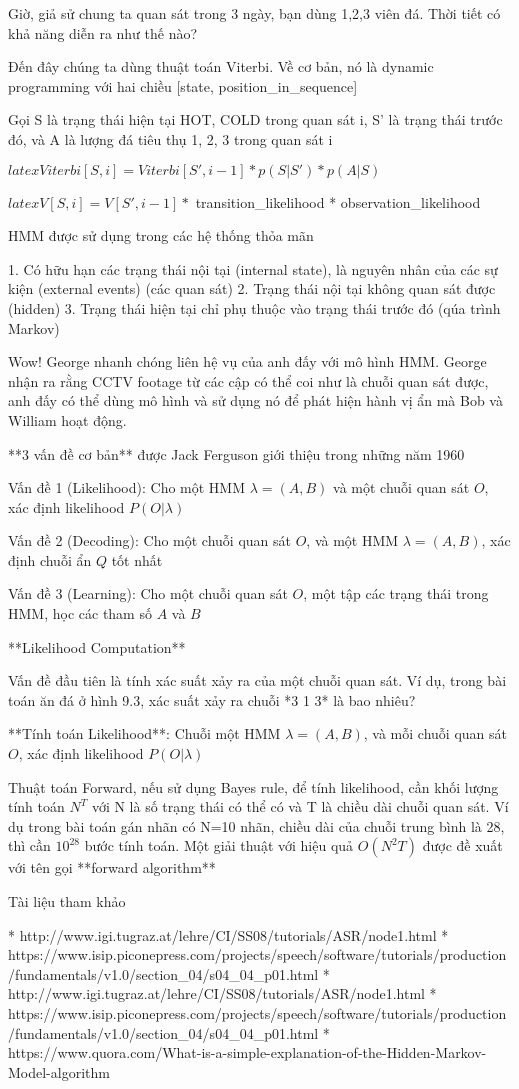 Giờ, giả sử chung ta quan sát trong 3 ngày, bạn dùng 1,2,3 viên đá. Thời tiết có khả năng diễn ra như thế nào?

Đến đây chúng ta dùng thuật toán Viterbi. Về cơ bản, nó là dynamic programming với hai chiều [state, position_in_sequence]

Gọi S là trạng thái hiện tại {HOT, COLD} trong quan sát i, S' là trạng thái trước đó, và A là lượng đá tiêu thụ {1, 2, 3} trong quan sát i

$latex Viterbi[S,i] = Viterbi[S', i-1] * p(S|S') * p(A|S)$

$latex V[S,i] = V[S',i-1] * $ transition_likelihood * observation_likelihood

HMM được sử dụng trong các hệ thống thỏa mãn

1. Có hữu hạn các trạng thái nội tại (internal state), là nguyên nhân của các sự kiện (external events) (các quan sát)
2. Trạng thái nội tại không quan sát được (hidden)
3. Trạng thái hiện tại chỉ phụ thuộc vào trạng thái trước đó (qúa trình Markov)

Wow! George nhanh chóng liên hệ vụ của anh đấy với mô hình HMM. George nhận ra rằng CCTV footage từ các cập có thể coi như là chuỗi quan sát được, anh đấy có thể dùng mô hình và sử dụng nó để phát hiện hành vị ẩn mà Bob và William hoạt động.

**3 vấn đề cơ bản** được Jack Ferguson giới thiệu trong những năm 1960

Vấn đề 1 (Likelihood): Cho một HMM $\lambda = (A, B)$ và một chuỗi quan sát $O$, xác định likelihood $P(O|\lambda)$

Vấn đề 2 (Decoding): Cho một chuỗi quan sát $O$, và một HMM $\lambda = (A,B)$, xác định chuỗi ẩn $Q$ tốt nhất

Vấn đề 3 (Learning): Cho một chuỗi quan sát $O$, một tập các trạng thái trong HMM, học các tham số $A$ và $B$

**Likelihood Computation**

Vấn đề đầu tiên là tính xác suất xảy ra của một chuỗi quan sát. Ví dụ, trong bài toán ăn đá ở hình 9.3, xác suất xảy ra chuỗi *3 1 3* là bao nhiêu?

**Tính toán Likelihood**: Chuỗi một HMM $\lambda = (A, B)$, và mỗi chuỗi quan sát $O$, xác định likelihood $P(O|\lambda)$

Thuật toán Forward, nếu sử dụng Bayes rule, để tính likelihood, cần khối lượng tính toán $N^T$ với N là số trạng thái có thể có và T là chiều dài chuỗi quan sát. Ví dụ trong bài toán gán nhãn có N=10 nhãn, chiều dài của chuỗi trung bình là 28, thì cần $10^{28}$ bước tính toán. Một giải thuật với hiệu quả $O(N^2T)$ được đề xuất với tên gọi **forward algorithm**

Tài liệu tham khảo

* http://www.igi.tugraz.at/lehre/CI/SS08/tutorials/ASR/node1.html
* https://www.isip.piconepress.com/projects/speech/software/tutorials/production/fundamentals/v1.0/section_04/s04_04_p01.html
* http://www.igi.tugraz.at/lehre/CI/SS08/tutorials/ASR/node1.html
* https://www.isip.piconepress.com/projects/speech/software/tutorials/production/fundamentals/v1.0/section_04/s04_04_p01.html
* https://www.quora.com/What-is-a-simple-explanation-of-the-Hidden-Markov-Model-algorithm